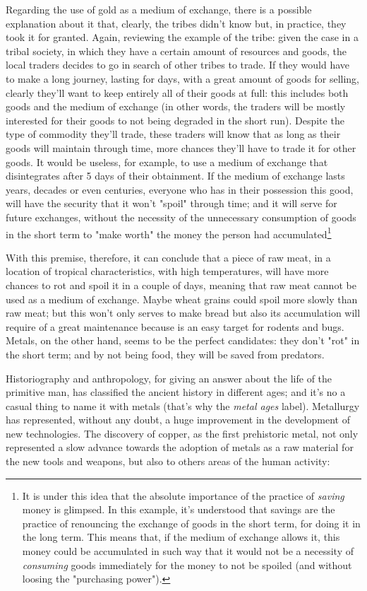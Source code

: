 \documentclass[12pt,a4paper,twoside]{book}
\begin{document}
Regarding the use of gold as a medium of exchange, there is a possible explanation about it that, clearly, the tribes didn't know but, in practice, they took it for granted. Again, reviewing the example of the tribe: given the case in a tribal society, in which they have a certain amount of resources and goods, the local traders decides to go in search of other tribes to trade. If they would have to make a long journey, lasting for days, with a great amount of goods for selling, clearly they'll want to keep entirely all of their goods at full: this includes both goods and the medium of exchange (in other words, the traders will be mostly interested for their goods to not being degraded in the short run). Despite the type of commodity they'll trade, these traders will know that as long as their goods will maintain through time, more chances they'll have to trade it for other goods. It would be useless, for example, to use a medium of exchange that disintegrates after 5 days of their obtainment. If the medium of exchange lasts years, decades or even centuries, everyone who has in their possession this good, will have the security that it won't "spoil" through time; and it will serve for future exchanges, without the necessity of the unnecessary consumption of goods in the short term to "make worth" the money the person had accumulated\footnote{It is under this idea that the absolute importance of the practice of \textit{saving} money is glimpsed. In this example, it's understood that savings are the practice of renouncing the exchange of goods in the short term, for doing it in the long term. This means that, if the medium of exchange allows it, this money could be accumulated in such way that it would not be a necessity of \textit{consuming} goods immediately for the money to not be spoiled (and without loosing the "purchasing power").}

With this premise, therefore, it can conclude that a piece of raw meat, in a location of tropical characteristics, with high temperatures, will have more chances to rot and spoil it in a couple of days, meaning that raw meat cannot be used as a medium of exchange. Maybe wheat grains could spoil more slowly than raw meat; but this won't only serves to make bread but also its accumulation will require of a great maintenance because is an easy target for rodents and bugs. Metals, on the other hand, seems to be the perfect candidates: they don't "rot" in the short term; and by not being food, they will be saved from predators.

Historiography and anthropology, for giving an answer about the life of the primitive man, has classified the ancient history in different ages; and it's no a casual thing to name it with metals (that's why the \textit{metal ages} label). Metallurgy has represented, without any doubt, a huge improvement in the development of new technologies. The discovery of copper, as the first prehistoric metal, not only represented a slow advance towards the adoption of metals as a raw material for the new tools and weapons, but also to others areas of the human activity:
\end{document}
